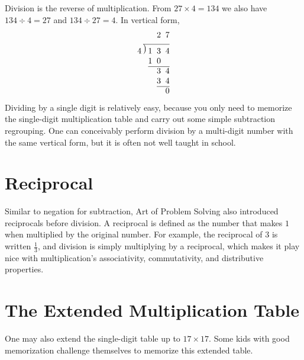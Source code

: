 Division is the reverse of multiplication. From $27 \times 4 = 134$ we also have $134 \div 4 = 27$ and $134 \div 27 = 4$. In vertical form,
\[
  \begin{array}{@{}c@{\hspace{0.2em}}c@{\hspace{0.15em}}c@{\hspace{0.55em}}c@{\hspace{0.55em}}c@{}}
        &   &   & 2 & 7 \\[0.45em]
    \cline{2-5}
      4 & \raisebox{0.65ex}{\big)} & 1 & 3 & 4 \\
        &   & 1 & 0 &   \\
    \cline{3-5}
        &   &   & 3 & 4 \\
        &   &   & 3 & 4 \\
    \cline{4-5}
        &   &   &   & 0
  \end{array}
\]
Dividing by a single digit is relatively easy, because you only need to memorize the single-digit multiplication table and carry out some simple subtraction regrouping. One can conceivably perform division by a multi-digit number with the same vertical form, but it is often not well taught in school.

\section{Reciprocal}

Similar to negation for subtraction, Art of Problem Solving also introduced reciprocals before division. A reciprocal is defined as the number that makes $1$ when multiplied by the original number. For example, the reciprocal of $3$ is written $\frac{1}{3}$, and division is simply multiplying by a reciprocal, which makes it play nice with multiplication's associativity, commutativity, and distributive properties.

\section{The Extended Multiplication Table}

One may also extend the single-digit table up to $17 \times 17$. Some kids with good memorization challenge themselves to memorize this extended table.


